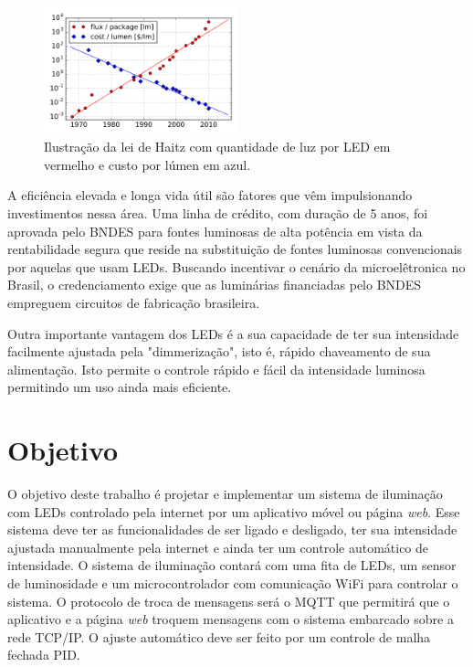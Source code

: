 \begin{figure}[ht]
    \begin{center}
    \includegraphics[width=0.5\textwidth]{figuras/haitz.png}
    \end{center}
    \caption[Ilustração da lei de Haitz.]{Ilustração da lei de Haitz com quantidade de luz por LED em vermelho e custo por lúmen em azul.}
    \label{haitz}
\end{figure}

A eficiência elevada e longa vida útil são fatores que vêm impulsionando investimentos nessa área. Uma linha de crédito, com duração de 5 anos, foi aprovada pelo BNDES \cite{bndes2} para fontes luminosas de alta potência em vista da rentabilidade segura que reside na substituição de fontes luminosas convencionais por aquelas que usam LEDs. Buscando incentivar o cenário da microelêtronica no Brasil, o credenciamento exige que as luminárias financiadas pelo BNDES empreguem circuitos de fabricação brasileira.

Outra importante vantagem dos LEDs é a sua capacidade de ter sua intensidade facilmente ajustada pela "dimmerização", isto é, rápido chaveamento de sua alimentação. Isto permite o controle rápido e fácil da intensidade luminosa permitindo um uso ainda mais eficiente.

\section{Objetivo}

O objetivo deste trabalho é projetar e implementar um sistema de iluminação com LEDs controlado pela internet por um aplicativo móvel ou página \textit{web}. Esse sistema deve ter as funcionalidades de ser ligado e desligado, ter sua intensidade ajustada manualmente pela internet e ainda ter um controle automático de intensidade. O sistema de iluminação contará com uma fita de LEDs, um sensor de luminosidade e um microcontrolador com comunicação WiFi para controlar o sistema. O protocolo de troca de mensagens será o MQTT que permitirá que o aplicativo e a página \textit{web} troquem mensagens com o sistema embarcado sobre a rede TCP/IP. O ajuste automático deve ser feito por um controle de malha fechada PID.

